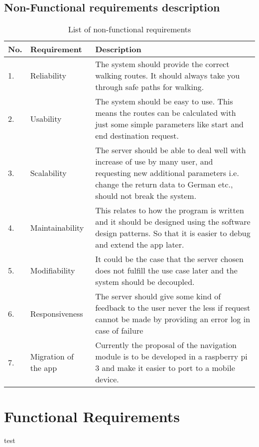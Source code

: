         \subsection{Non-Functional requirements description}
            \label{ssec:nonFuncList}
            \begin{table}[h!]
                \centering
                    \begin{tabular}{|p{0.5cm}||p{3cm}|p{9cm}|}
                        \hline
                            No. & Requirement & Description \\
                        \hline
                            1. &  Reliability & The system should provide the
                            correct walking routes. It should always take you through safe paths for 
                            walking.\\
                        \hline
                            2. & Usability & The system should be easy to use. This means the routes can be
                            calculated with just some simple parameters like start and end destination request.\\
                            
                        \hline
                            3. & Scalability & The server should be able to deal well with increase of use by many user,
                            and requesting new additional parameters i.e. change the return data to German etc., 
                            should not break the system.\\    
                        
                        \hline
                            4. & Maintainability & This relates to how the program is written and it 
                            should be designed using the software design patterns. So that it is easier to
                            debug and extend the app later.\\
                        \hline    
                            5. & Modifiability & It could be the case that the server chosen does not 
                            fulfill the use case later and the system should be decoupled.\\
                        \hline
                            6. & Responsiveness & The server should give some kind of feedback to the user
                            never the less if request cannot be made by providing an error log in case of
                            failure\\
                        \hline
                            7. & Migration of the app & Currently the proposal of the navigation module is to be
                            developed in a raspberry pi 3  and make it easier to port to a mobile device.\\ 
                                 
                        \hline    
                    \end{tabular}    
                \caption{List of non-functional requirements}
                \label{table:nonfunctionalRequirements}
            \end{table}   

    \section{Functional Requirements}
    test
